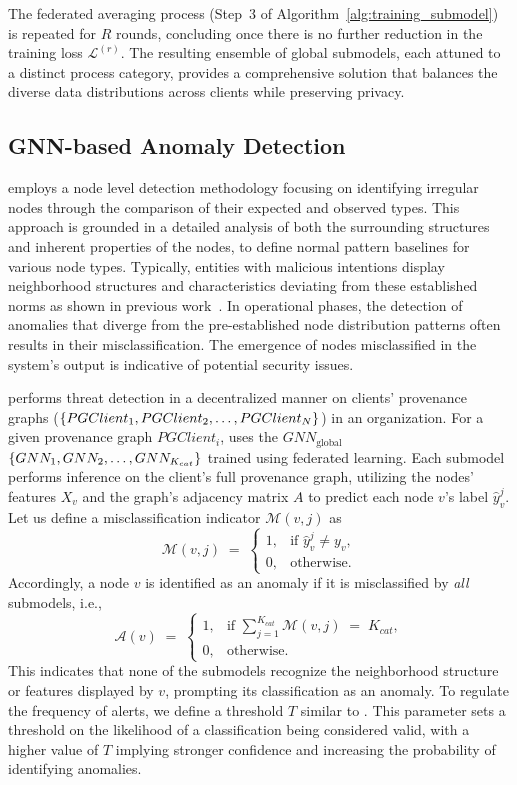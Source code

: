 The federated averaging process (Step~3 of Algorithm~\ref{alg:training_submodel}) is repeated for \( R \) rounds, concluding once there is no further reduction in the training loss \(\mathcal{L}^{(r)}\). The resulting ensemble of global submodels, each attuned to a distinct process category, provides a comprehensive solution that balances the diverse data distributions across clients while preserving privacy.


\subsection{GNN-based Anomaly Detection}
\label{sys:anomaly_detection}

\Sys employs a node level detection methodology focusing on identifying irregular nodes through the comparison of their expected and observed types. This approach is grounded in a detailed analysis of both the surrounding structures and inherent properties of the nodes, to define normal pattern baselines for various node types. Typically, entities with malicious intentions display neighborhood structures and characteristics deviating from these established norms as shown in previous work~\cite{flash2024,cheng2023kairos,yangprographer}. In operational phases, the detection of anomalies that diverge from the pre-established node distribution patterns often results in their misclassification. The emergence of nodes misclassified in the system's output is indicative of potential security issues.

\Sys performs threat detection in a decentralized manner on clients' provenance graphs (\( \{PGClient_{1}, PGClient_{2}, \ldots, \\ PGClient_{N}\} \)) in an organization. For a given provenance graph \(PGClient_{i}\), \Sys uses the \( {GNN}_{\text{global}} \) \(\{GNN_1, \\ GNN_2, \ldots, GNN_{K_{cat}}\}\) trained using federated learning. Each submodel performs inference on the client's full provenance graph, utilizing the nodes' features \(X_v\) and the graph's adjacency matrix \(A\) to predict each node \(v\)'s label \(\hat{y}_v^j\). Let us define a misclassification indicator \(\mathcal{M}(v, j)\) as
\[
\mathcal{M}(v, j) \;=\;
\begin{cases}
1, & \text{if } \hat{y}_v^j \neq y_v,\\
0, & \text{otherwise}.
\end{cases}
\]
Accordingly, a node \(v\) is identified as an anomaly if it is misclassified by \emph{all} submodels, i.e.,
\[
\mathcal{A}(v) \;=\;
\begin{cases}
1, & \text{if } \sum_{j=1}^{K_{cat}} \mathcal{M}(v, j) \;=\; K_{cat},\\
0, & \text{otherwise}.
\end{cases}
\]
This indicates that none of the submodels recognize the neighborhood structure or features displayed by \(v\), prompting its classification as an anomaly. To regulate the frequency of alerts, we define a threshold \(T\) similar to \flash. This parameter sets a threshold on the likelihood of a classification being considered valid, with a higher value of \(T\) implying stronger confidence and increasing the probability of identifying anomalies.
